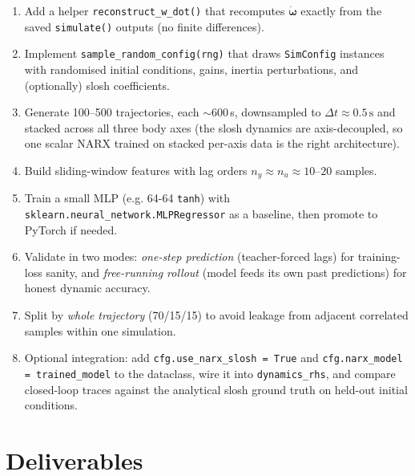 \begin{enumerate}\setlength{\itemsep}{2pt}
  \item Add a helper \texttt{reconstruct\_w\_dot()} that recomputes
        \(\dot{\bm{\omega}}\) exactly from the saved \texttt{simulate()}
        outputs (no finite differences).
  \item Implement \texttt{sample\_random\_config(rng)} that draws
        \texttt{SimConfig} instances with randomised initial conditions,
        gains, inertia perturbations, and (optionally) slosh coefficients.
  \item Generate 100--500 trajectories, each $\sim$600\,s, downsampled to
        \(\Delta t \approx 0.5\,\mathrm{s}\) and stacked across all three
        body axes (the slosh dynamics are axis-decoupled, so one scalar
        NARX trained on stacked per-axis data is the right architecture).
  \item Build sliding-window features with lag orders
        \(n_y \approx n_u \approx 10\)--\(20\) samples.
  \item Train a small MLP (e.g. 64-64 \texttt{tanh}) with
        \texttt{sklearn.neural\_network.MLPRegressor} as a baseline, then
        promote to PyTorch if needed.
  \item Validate in two modes:
        \emph{one-step prediction} (teacher-forced lags) for training-loss
        sanity, and \emph{free-running rollout} (model feeds its own past
        predictions) for honest dynamic accuracy.
  \item Split by \emph{whole trajectory} (70/15/15) to avoid leakage from
        adjacent correlated samples within one simulation.
  \item Optional integration: add \texttt{cfg.use\_narx\_slosh = True}
        and \texttt{cfg.narx\_model = trained\_model} to the dataclass,
        wire it into \texttt{dynamics\_rhs}, and compare closed-loop
        traces against the analytical slosh ground truth on held-out
        initial conditions.
\end{enumerate}


\section{Deliverables}

